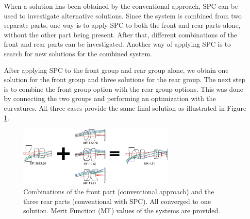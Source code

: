 When a solution has been obtained by the conventional approach, SPC can be used to investigate alternative solutions. Since the system is combined from two separate parts, one way is to apply SPC to both the front and rear parts alone, without the other part being present. After that, different combinations of the front and rear parts can be investigated. Another way of applying SPC is to search for new solutions for the combined system.

After applying SPC to the front group and rear group alone, we obtain one solution for the front group and three solutions for the rear group. The next step is to combine the front group option with the rear group options. This was done by connecting the two groups and performing an optimization with the curvatures. All three cases provide the same final solution as illustrated in Figure \ref{fig:WAL_combine}.

\begin{figure}[h!]
    \centering
    \includegraphics[width=0.7\textwidth]{chapter-4/figures/WAL_combine.png}
    \caption{Combinations of the front part (conventional approach) and the three rear parts (conventional with SPC). All converged to one solution. Merit Function (MF) values of the systems are provided. }
    \label{fig:WAL_combine}
\end{figure}

